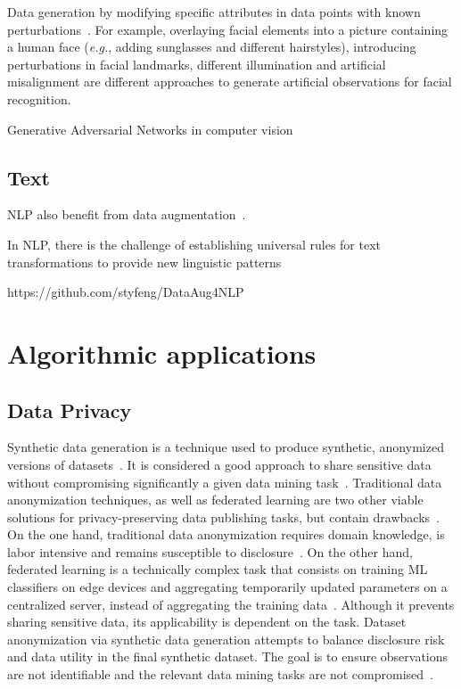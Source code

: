 \documentclass[parskip=full]{scrartcl}
\begin{document}
Data generation by modifying specific attributes in data points with known
perturbations~\cite{lv2017data}. For example, overlaying facial elements into
a picture containing a human face (\textit{e.g.}, adding sunglasses and
different hairstyles), introducing perturbations in facial landmarks,
different illumination and artificial misalignment are different approaches to
generate artificial observations for facial recognition.

Generative Adversarial Networks in computer vision~\cite{wang2021generative}


\subsection{Text}

NLP also benefit from data augmentation~\cite{feng2021survey}.

In NLP, there is the challenge of establishing universal rules for text
transformations to provide new linguistic patterns~\cite{bayer2022data}

https://github.com/styfeng/DataAug4NLP

\section{Algorithmic applications}

\subsection{Data Privacy}

Synthetic data generation is a technique used to produce synthetic, anonymized
versions of datasets~\cite{dankar2021fake}. It is considered a good approach
to share sensitive data without compromising significantly a given data mining
task~\cite{taub2018differential, park2018data}. Traditional data anonymization
techniques, as well as federated learning are two other viable solutions for
privacy-preserving data publishing tasks, but contain
drawbacks~\cite{hernandez2022synthetic}. On the one hand, traditional data
anonymization requires domain knowledge, is labor intensive and remains
susceptible to disclosure~\cite{reiter2004new}. On the other hand, federated
learning is a technically complex task that consists on training ML
classifiers on edge devices and aggregating temporarily updated parameters on
a centralized server, instead of aggregating the training
data~\cite{yu2022survey}. Although it prevents sharing sensitive data, its
applicability is dependent on the task. Dataset anonymization via synthetic
data generation attempts to balance disclosure risk and data utility in the
final synthetic dataset. The goal is to ensure observations are not
identifiable and the relevant data mining tasks are not
compromised~\cite{singh2017aggregating, li2018privacy}.
\end{document}
